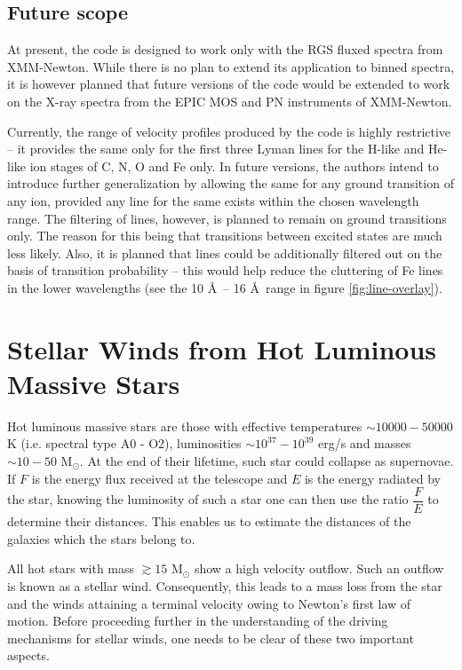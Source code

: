     \subsection{Future scope} \label{tool:rgs-files:scope}
    	At present, the code is designed to work only with the RGS fluxed spectra from XMM-Newton. While there is no plan to extend its application to binned spectra, it is however planned that future versions of the code would be extended to work on the X-ray spectra from the EPIC MOS and PN instruments of XMM-Newton.
    	
    	Currently, the range of velocity profiles produced by the code is highly restrictive -- it provides the same only for the first three Lyman lines for the H-like and He-like ion stages of C, N, O and Fe only. In future versions, the authors intend to introduce further generalization by allowing the same for any ground transition of any ion, provided any line for the same exists within the chosen wavelength range. The filtering of lines, however, is planned to remain on ground transitions only. The reason for this being that transitions between excited states are much less likely. Also, it is planned that lines could be additionally filtered out on the basis of transition probability -- this would help reduce the cluttering of Fe lines in the lower wavelengths (see the 10 \AA\ -- 16 \AA\ range in figure \ref{fig:line-overlay}).
    
    \section{Stellar Winds from Hot Luminous Massive Stars} \label{tool:stellar-winds}
        Hot luminous massive stars are those with effective temperatures $\sim 10000-50000$ K (i.e. spectral type A0 - O2), luminosities $\sim 10^{37}-10^{39}$ erg/s and masses $\sim 10-50$ M$_\odot$. At the end of their lifetime, such star could collapse as supernovae. If $F$ is the energy flux received at the telescope and $E$ is the energy radiated by the star, knowing the luminosity of such a star one can then use the ratio $\dfrac{F}{E}$ to determine their distances. This enables us to estimate the distances of the galaxies which the stars belong to.
        
        All hot stars with mass $\gtrsim 15$ M$_\odot$ show a high velocity outflow\cite{kudritzki2000winds}. Such an outflow is known as a stellar wind. Consequently, this leads to a mass loss from the star and the winds attaining a terminal velocity owing to Newton's first law of motion. Before proceeding further in the understanding of the driving mechanisms for stellar winds, one needs to be clear of these two important aspects.
        
